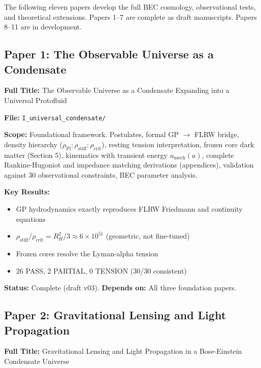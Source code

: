 \documentclass[11pt,a4paper]{article}
\newcommand{\rhostiff}{\ensuremath{\rho_{\mathrm{stiff}}}}
\begin{document}
The following eleven papers develop the full BEC cosmology, observational tests, and theoretical extensions. Papers 1--7 are complete as draft manuscripts. Papers 8--11 are in development.

\subsection{Paper 1: The Observable Universe as a Condensate}
\label{sec:paper1}

\textbf{Full Title:} The Observable Universe as a Condensate Expanding into a Universal Protofluid

\textbf{File:} \texttt{I\_universal\_condensate/}

\textbf{Scope:} Foundational framework. Postulates, formal GP $\to$ FLRW bridge, density hierarchy ($\rho_{\mathrm{Pl}} : \rhostiff : \rho_{\mathrm{crit}}$), resting tension interpretation, frozen core dark matter (Section 5), kinematics with transient energy $u_{\mathrm{mech}}(a)$, complete Rankine-Hugoniot and impedance matching derivations (appendices), validation against 30 observational constraints, BEC parameter analysis.

\textbf{Key Results:}
\begin{itemize}[leftmargin=*, itemsep=0.1em]
\item GP hydrodynamics exactly reproduces FLRW Friedmann and continuity equations
\item $\rhostiff/\rho_{\mathrm{crit}} = R_H^2/3 \approx 6 \times 10^{51}$ (geometric, not fine-tuned)
\item Frozen cores resolve the Lyman-alpha tension
\item 26 PASS, 2 PARTIAL, 0 TENSION (30/30 consistent)
\end{itemize}

\textbf{Status:} Complete (draft v03). \quad \textbf{Depends on:} All three foundation papers.

\subsection{Paper 2: Gravitational Lensing and Light Propagation}
\label{sec:paper2}

\textbf{Full Title:} Gravitational Lensing and Light Propagation in a Bose-Einstein Condensate Universe
\end{document}
